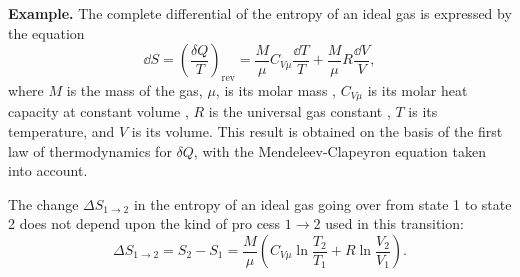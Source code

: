 \textbf{Example.} The complete differential of the entropy of an ideal gas is expressed by the equation 
\begin{equation*}%
\dd S = \left( \frac{\delta Q}{T} \right)_{\textrm{rev}}= \frac{M}{\mu} C_{V \mu} \frac{\dd T}{T} + \frac{M}{\mu} R \frac{\dd V}{V},
\end{equation*}
where $M$ is the mass of the gas, $\mu$, is its molar mass , $C_{V \mu}$ is its molar heat capacity at constant volume , $R$ is the universal gas constant , $T$ is its temperature, and $V$ is its volume. This result is obtained on the basis of the first law of thermodynamics  for $\delta Q$, with the Mendeleev-Clapeyron equation  taken into account.

The change $\Delta S_{1 \to 2}$ in the entropy of an ideal gas going over from state 1 to state 2 does not depend upon the kind of pro­ cess $1 \to 2$ used in this transition:
\begin{equation*}%
\Delta S_{1 \to 2} = S_{2} - S_{1} = \frac{M}{\mu}  \left( C_{V \mu} \ln \frac{T_{2}}{T_{1}} +  R \ln \frac{V_{2}}{V_{1}} \right).
\end{equation*}
